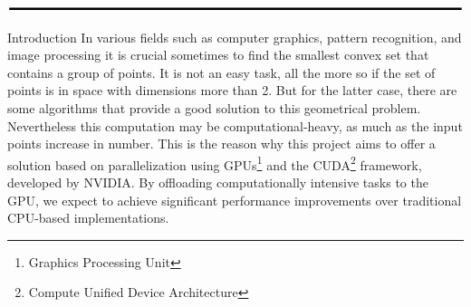 \documentclass[a4paper,oneside,11pt,DIV12,headsepline,footexclude,headexclude]{scrartcl}
\begin{document}
\[\rule{135mm}{.5mm}\]
\begin{section}{Introduction}
 In various fields such as computer graphics, pattern recognition, and image processing it is crucial sometimes to find the smallest convex set that contains a group of points. It is not an easy task, all the more so if the set of points is in space with dimensions more than 2. But for the latter case, there are some algorithms that provide a good solution to this geometrical problem. Nevertheless this computation may be computational-heavy, as much as the input points increase in number. This is the reason why this project aims to offer a solution based on parallelization using GPUs\footnote{Graphics Processing Unit} and the CUDA\footnote{Compute Unified Device Architecture} framework, developed by NVIDIA. By offloading computationally intensive tasks to the GPU, we expect to achieve significant performance improvements over traditional CPU-based implementations.

\end{section}
\end{document}
